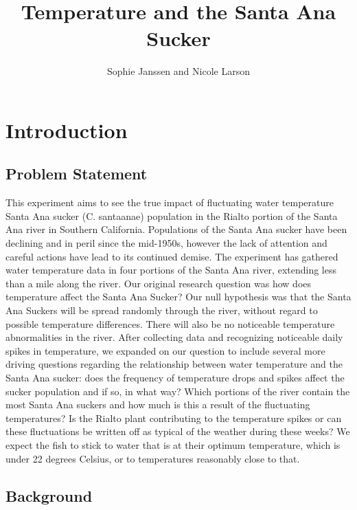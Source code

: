 \documentclass{article}
\title{Temperature and the Santa Ana Sucker}
\author{Sophie Janssen and Nicole Larson}
\begin{document}



\maketitle

\newpage
\tableofcontents
\newpage

\section{Introduction}

\subsection{Problem Statement}

This experiment aims to see the true impact of fluctuating water temperature Santa Ana sucker (C. santaanae) population in the Rialto portion of the Santa Ana river in Southern California. Populations of the Santa Ana sucker have been declining and in peril since the mid-1950s, however the lack of attention and careful actions have lead to its continued demise. The experiment has gathered water temperature data in four portions of the Santa Ana river, extending less than a mile along the river. Our original research question was how does temperature affect the Santa Ana Sucker? Our null hypothesis was that the Santa Ana Suckers will be spread randomly through the river, without regard to possible temperature differences. There will also be no noticeable temperature abnormalities in the river. After collecting data and recognizing noticeable daily spikes in temperature, we expanded on our question to include several more driving questions regarding the relationship between water temperature and the Santa Ana sucker: does the frequency of temperature drops and spikes affect the sucker population and if so, in what way? Which portions of the river contain the most Santa Ana suckers and how much is this a result of the fluctuating temperatures? Is the Rialto plant contributing to the temperature spikes or can these fluctuations be written off as typical of the weather during these weeks? We expect the fish to stick to water that is at their optimum temperature, which is under 22 degrees Celsius, or to temperatures reasonably close to that. 

\subsection{Background}
\end{document}
